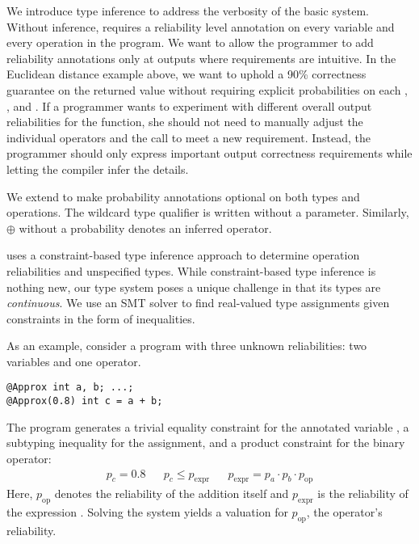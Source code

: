 We introduce type inference to address the verbosity of the basic system.
Without inference, \lang requires a reliability level annotation on every
variable and every operation in the program.
We want to allow the programmer to add reliability annotations only at
outputs where requirements are intuitive.
In the Euclidean distance example above, we want to uphold a 90\% correctness
guarantee on the returned value without requiring explicit probabilities on
each \code{+}, \code{*}, and .
If a programmer wants to experiment with different overall output reliabilities
for the  function, she should not need to manually adjust the
individual operators and the  call to meet a new requirement.
Instead, the programmer should only express important output correctness
requirements while letting the compiler infer the details.

We extend \lang to make probability annotations optional on both types and
operations.
The wildcard type qualifier is written  without a
parameter.
Similarly, $\oplus$ without a probability denotes an inferred operator.


\lang uses a constraint-based type inference approach to determine operation
reliabilities and unspecified types.
While constraint-based type inference is nothing new, our type system poses a
unique challenge in that its types are \emph{continuous}.
We use an SMT solver to find real-valued type assignments given
constraints in the form of inequalities.

As an example, consider a program with three unknown reliabilities: two
variables and one operator.
%
\begin{lstlisting}
@Approx int a, b; ...;
@Approx(0.8) int c = a + b;
\end{lstlisting}
%
The program generates a trivial equality constraint for the annotated variable
,
a subtyping inequality for the assignment,
and a product constraint for the binary operator:
\begin{align*}
    p_c = 0.8 &&
    p_c \le p_\text{expr} &&
    p_\text{expr} = p_a \cdot p_b \cdot p_\text{op}
\end{align*}
%
Here, $p_\text{op}$ denotes the reliability of the addition itself and
$p_\text{expr}$ is the reliability of the expression .
Solving the system yields a valuation for $p_\text{op}$, the operator's reliability.

